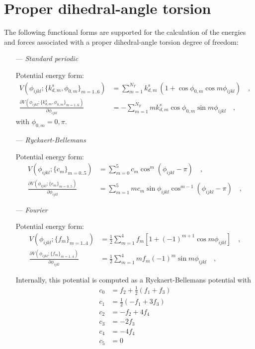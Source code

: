 \documentclass[10pt,a4paper]{report}
\numberwithin{equation}{section}
\begin{document}
\section{Proper dihedral-angle torsion}
\label{sec:proper-terms}

The following functional forms are supported for the calculation of
the energies and forces associated with a proper dihedral-angle
torsion degree of freedom:\cite{GROMOS-doc,GROMACS-doc}

\begin{itemize}
\item [---] \textit{Standard periodic}
  \par
  Potential energy form:
  \begin{align}
    \label{eq:proper-standard-energy}
    V(\phi_{ijkl} ; \{k_{d,m}^s, \phi_{0,m}\}_{m=1..6}) & = \sum_{m=1}^{N_T} k_{d,m}^s\ (1 + \cos{\phi_{0,m}} \cos{m \phi_{ijkl}})\quad , \\ \nonumber
    \frac{\partial V(\phi_{ijkl} ; \{k_{d,m}^s, \phi_{0,m}\}_{m=1..6})}{\partial \phi_{ijkl}} & = -\sum_{m=1}^{N_T} m k_{d,m}^s \cos{\phi_{0,m}} \sin{m \phi_{ijkl}}\quad ,
  \end{align}
  with $\phi_{0,m}=0,\pi$.
  
\item [---]\textit{Ryckaert-Bellemans}
  \par
  Potential energy form:
  \begin{align}
    \label{eq:proper-rb-energy}
    V(\phi_{ijkl} ; \{c_m\}_{m=0..5}) & = \sum_{m=0}^{5} c_m \cos^m{(\phi_{ijkl}-\pi)} \quad , \\ \nonumber
    \frac{\partial V(\phi_{ijkl} ; \{c_m\}_{m=0..5})}{\partial \phi_{ijkl}} & = \sum_{m=1}^{5} mc_m \sin{\phi_{ijkl}} \cos^{m-1}{(\phi_{ijkl}-\pi)} \quad , 
  \end{align}

\item [---]\textit{Fourier}
  \par
  Potential energy form:
   \begin{align}
    \label{eq:proper-fourier-energy}
     V(\phi_{ijkl} ; \{f_m\}_{m=1..4}) & = \frac{1}{2} \sum_{m=1}^{4} f_m \left[1 + (-1)^{m+1}\cos m\phi_{ijkl}\right] \quad , \\ \nonumber
     \frac{\partial V(\phi_{ijkl} ; \{f_m\}_{m=1..4})}{\partial \phi_{ijkl}} & = \frac{1}{2} \sum_{m=1}^{4} m f_m (-1)^{m}\sin m\phi_{ijkl} \quad ,
   \end{align}
   
   Internally, this potential is computed as a Ryckaert-Bellemans potential with
   \begin{align*}
     c_0 & = f_2 + \frac{1}{2} (f_1 + f_3)\\
     c_1 & = \frac{1}{2} (-f_1 + 3f_3)\\
     c_2 & = -f_2 + 4f_4\\
     c_3 & = -2 f_3\\
     c_4 & = -4 f_4\\
     c_5 & = 0
   \end{align*}


\end{itemize}
\end{document}
